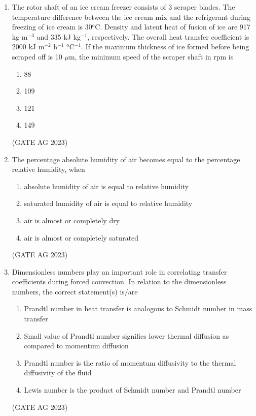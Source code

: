 \documentclass[journal,12pt,onecolumn]{IEEEtran}
\theoremstyle{remark}
\begin{document}
\begin{enumerate}
    \item The rotor shaft of an ice cream freezer consists of 3 scraper blades. The temperature difference between the ice cream mix and the refrigerant during freezing of ice cream is 30$^{o}$C. Density and latent heat of fusion of ice are 917 kg m$^{-3}$ and 335 kJ kg$^{-1}$, respectively. The overall heat transfer coefficient is 2000 kJ m$^{-2}$ h$^{-1}$ $^{o}$C$^{-1}$. If the maximum thickness of ice formed before being scraped off is 10 $\mu$m, the minimum speed of the scraper shaft in rpm is
    \begin{multicols}{4}
    \begin{enumerate}
        \item 88
        \item 109
        \item 121
        \item 149
    \end{enumerate}
    \end{multicols}
\hfill{(GATE AG 2023)}

    \item The percentage absolute humidity of air becomes equal to the percentage relative humidity, when
    \begin{enumerate}
        \item absolute humidity of air is equal to relative humidity
        \item saturated humidity of air is equal to relative humidity
        \item air is almost or completely dry
        \item air is almost or completely saturated
    \end{enumerate}
\hfill{(GATE AG 2023)}

    \item Dimensionless numbers play an important role in correlating transfer coefficients during forced convection. In relation to the dimensionless numbers, the correct statement(s) is/are
    \begin{enumerate}
        \item Prandtl number in heat transfer is analogous to Schmidt number in mass transfer
        \item Small value of Prandtl number signifies lower thermal diffusion as compared to momentum diffusion
        \item Prandtl number is the ratio of momentum diffusivity to the thermal diffusivity of the fluid
        \item Lewis number is the product of Schmidt number and Prandtl number
    \end{enumerate}
\hfill{(GATE AG 2023)}


\end{enumerate}
\end{document}
